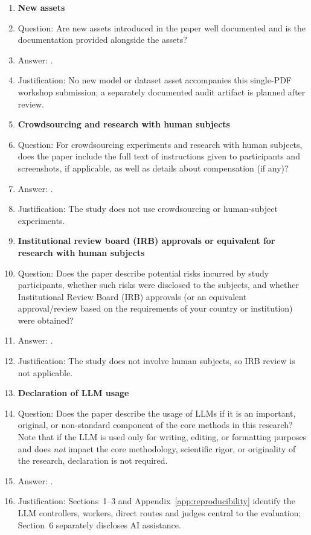 \begin{enumerate}
\item {\bf New assets}
\item[] Question: Are new assets introduced in the paper well documented and is the documentation provided alongside the assets?
\item[] Answer: \answerNA{}.
\item[] Justification: No new model or dataset asset accompanies this single-PDF workshop submission; a separately documented audit artifact is planned after review.

\item {\bf Crowdsourcing and research with human subjects}
\item[] Question: For crowdsourcing experiments and research with human subjects, does the paper include the full text of instructions given to participants and screenshots, if applicable, as well as details about compensation (if any)?
\item[] Answer: \answerNA{}.
\item[] Justification: The study does not use crowdsourcing or human-subject experiments.

\item {\bf Institutional review board (IRB) approvals or equivalent for research with human subjects}
\item[] Question: Does the paper describe potential risks incurred by study participants, whether such risks were disclosed to the subjects, and whether Institutional Review Board (IRB) approvals (or an equivalent approval/review based on the requirements of your country or institution) were obtained?
\item[] Answer: \answerNA{}.
\item[] Justification: The study does not involve human subjects, so IRB review is not applicable.

\item {\bf Declaration of LLM usage}
\item[] Question: Does the paper describe the usage of LLMs if it is an important, original, or non-standard component of the core methods in this research? Note that if the LLM is used only for writing, editing, or formatting purposes and does \emph{not} impact the core methodology, scientific rigor, or originality of the research, declaration is not required.
\item[] Answer: \answerYes{}.
\item[] Justification: Sections~1--3 and Appendix~\ref{app:reproducibility} identify the LLM controllers, workers, direct routes and judges central to the evaluation; Section~6 separately discloses AI assistance.

\end{enumerate}
